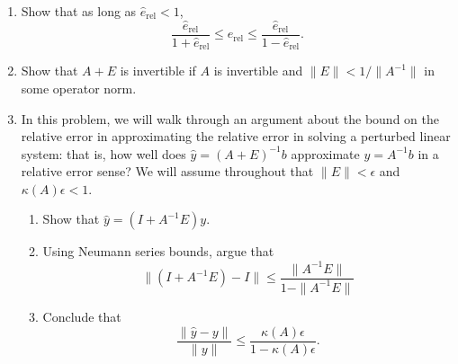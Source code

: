 \documentclass[12pt, leqno]{article}
\begin{document}
\begin{enumerate}
\item Show that as long as $\hat{e}_{\mathrm{rel}} < 1$,
  \[
  \frac{\hat{e}_{\mathrm{rel}}}{1+\hat{e}_{\mathrm{rel}}} \leq
  e_{\mathrm{rel}} \leq
  \frac{\hat{e}_{\mathrm{rel}}}{1-\hat{e}_{\mathrm{rel}}}.
  \]
\item Show that $A+E$ is invertible if $A$ is invertible and
  $\|E\| < 1/\|A^{-1}\|$ in some operator norm.
\item In this problem, we will walk through an argument about
  the bound on the relative error in approximating the
  relative error in solving a perturbed linear system:
  that is, how well does $\hat{y} = (A+E)^{-1} b$ approximate
  $y = A^{-1} b$ in a relative error sense?  We will assume
  throughout that $\|E\| < \epsilon$ and $\kappa(A) \epsilon < 1$.
  \begin{enumerate}
  \item Show that $\hat{y} = (I+A^{-1} E) y$.
  \item Using Neumann series bounds, argue that
    \[
      \|(I+A^{-1} E)-I\| \leq \frac{\|A^{-1} E\|}{1-\|A^{-1} E\|}
    \]
  \item Conclude that
    \[
    \frac{\|\hat{y}-y\|}{\|y\|} \leq
    \frac{\kappa(A) \epsilon}{1-\kappa(A) \epsilon}.
    \]
  \end{enumerate}
\end{enumerate}
\end{document}
